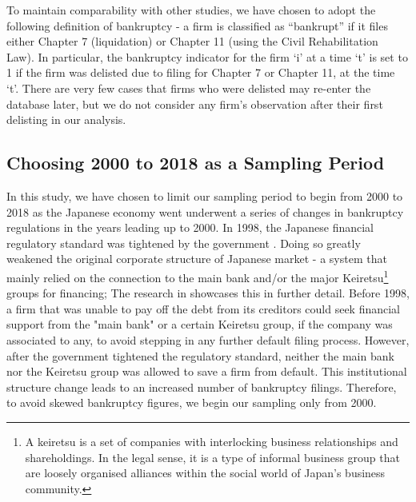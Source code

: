
To maintain comparability with other studies, we have chosen to adopt the following definition of bankruptcy - a firm is classified as “bankrupt” if it files either Chapter 7 (liquidation) or Chapter 11 (using the Civil Rehabilitation Law). 
In particular, the bankruptcy indicator for the firm `i' at a time `t' is set to 1 if the firm was delisted due to filing for Chapter 7 or Chapter 11, at the time `t'. There are very few cases that firms who were delisted may re-enter the database later, but we do not consider any firm's observation after their first delisting in our analysis. 

\subsection{Choosing 2000 to 2018 as a Sampling Period}
\label{sec:financialHistory}
In this study, we have chosen to limit our sampling period to begin from 2000 to 2018 as the Japanese economy went underwent a series of changes in bankruptcy regulations in the years leading up to 2000.
In 1998, the Japanese financial regulatory standard was tightened by the government \cite{nakamura2006japanese}. Doing so greatly weakened the original corporate structure of Japanese market - a system that mainly relied on the connection to the main bank and/or the major Keiretsu\footnote{A keiretsu is a set of companies with interlocking business relationships and shareholdings. In the legal sense, it is a type of informal business group that are loosely organised alliances within the social world of Japan's business community.} groups for financing; The research in \cite{xu2009bankruptcy} showcases this in further detail. 
Before 1998, a firm that was unable to pay off the debt from its creditors could seek financial support from the "main bank" or a certain Keiretsu group, if the company was associated to any, to avoid stepping in any further default filing process. However, after the government tightened the regulatory standard, neither the main bank nor the Keiretsu group was allowed to save a firm from default. This institutional structure change leads to an increased number of bankruptcy filings. Therefore, to avoid skewed bankruptcy figures, we begin our sampling only from 2000. 


